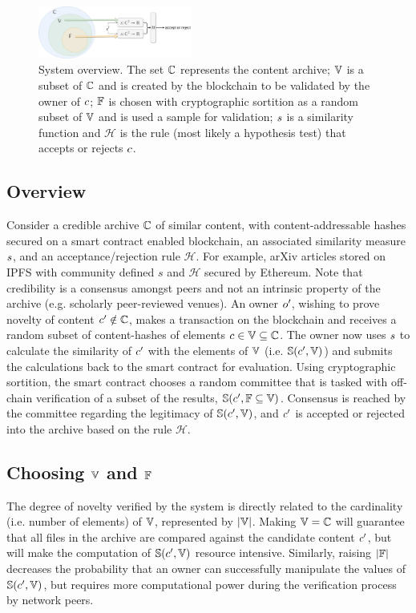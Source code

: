 \documentclass[conference]{IEEEtran}
\begin{document}
\begin{figure}
    \centering
    \includegraphics[width=0.45\textwidth, keepaspectratio]{assets/pon-diagram-full-icbc2020.png}
    \caption{System overview. The set ${{\mathbb{C}}}$ represents the content archive; ${\mathbb{V}}$ is a subset of ${{\mathbb{C}}}$ and is created by the blockchain to be validated by the owner of ${c}$; ${\mathbb{F}}$ is chosen with cryptographic sortition as a random subset of ${\mathbb{V}}$ and is used a sample for validation; ${s}$ is a similarity function and $\mathcal{H}$ is the rule (most likely a hypothesis test) that accepts or rejects ${c}$.}
    \label{fig:diagram}
\end{figure}

\subsection{Overview}\label{overview}
Consider a credible archive ${{\mathbb{C}}}$ of similar content, with content-addressable hashes secured on a smart contract enabled blockchain, an associated similarity measure ${s}$, and an acceptance/rejection rule $\mathcal{H}$. For example, arXiv articles stored on IPFS with community defined $s$ and $\mathcal{H}$ secured by Ethereum. Note that credibility is a consensus amongst peers and not an intrinsic property of the archive (e.g. scholarly peer-reviewed venues). An owner ${o}^\prime$,  wishing to prove novelty of content ${c}^\prime \notin {{\mathbb{C}}}$, makes a transaction on the blockchain and receives a random subset of content-hashes of elements ${c} \in {\mathbb{V}} \subseteq {{\mathbb{C}}}$. The owner now uses ${s}$ to calculate the similarity of ${c}^\prime$ with the elements of ${\mathbb{V}}$ (i.e. ${\mathbb{S}}({c}^\prime, {\mathbb{V}})$) and submits the calculations back to the smart contract for evaluation. Using cryptographic sortition, the smart contract chooses a random committee that is tasked with off-chain verification of a subset of the results, ${\mathbb{S}}({c}^\prime, {\mathbb{F}} \subseteq {\mathbb{V}})$. Consensus is reached by the committee regarding the legitimacy of ${\mathbb{S}}({c}^\prime, {\mathbb{V}})$, and ${c}^\prime$ is accepted or rejected into the archive based on the rule $\mathcal{H}$.

\subsection{Choosing ${\mathbb{V}}$ and ${\mathbb{F}}$}
The degree of novelty verified by the system is directly related to the cardinality (i.e. number of elements) of ${\mathbb{V}}$, represented by $\vert{\mathbb{V}}\vert$. Making ${\mathbb{V}} = {{\mathbb{C}}}$ will guarantee that all files in the archive are compared against the candidate content ${c}^\prime$, but will make the computation of ${\mathbb{S}}({c}^\prime, {\mathbb{V}})$ resource intensive. Similarly, raising $\vert{\mathbb{F}}\vert$ decreases the probability that an owner can successfully manipulate the values of ${\mathbb{S}}({c}^\prime, {\mathbb{V}})$, but requires more computational power during the verification process by network peers.
\end{document}

